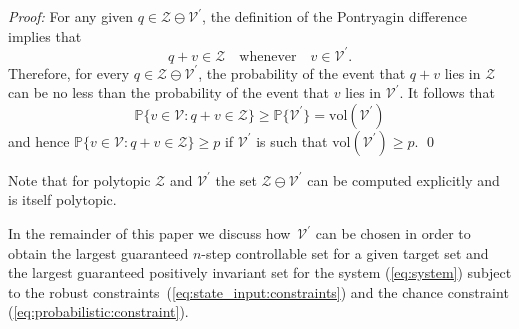 \documentclass{ifacconf}
\def\bpf{\textnormal{\textit{Proof:}\hspace{1ex}}}
\def\epf{\hfill \mbox{\qed}}%
\providecommand{\vol}{\text{vol}}
\providecommand{\V}{\mathcal V}
\providecommand{\Z}{\mathcal Z}
\providecommand{\PP}{\mathbb P}
\begin{document}
\bpf
%
For any given $q\in\Z\ominus\V^\prime$, the definition of the Pontryagin difference implies that
\[
q+v\in\Z \quad \text{whenever} \quad  v\in\V^\prime.
\]
Therefore, for every $q\in\Z\ominus\V^\prime$, the probability of the event that $q+v$ lies in $\Z$ can be no less than the probability of the event that $v$ lies in $\V^\prime$. It follows that 
\[
\PP\{ v\in\V : q + v\in \Z\} \geq \PP\{\V^\prime\} = \vol(\V^\prime)
\]
and hence $\PP\{ v\in\V : q + v\in \Z\} \geq p$ if $\V^\prime$ is such that $\vol(\V^\prime) \geq p$.
\epf
%

Note that for polytopic $\Z$ and $\V^\prime$ the set $\Z\ominus\V^\prime$ can be computed explicitly and is itself polytopic.

In the remainder of this paper we discuss how~$\V^\prime$ can be chosen in order to obtain the largest guaranteed $n$-step controllable set for a given target set and the largest guaranteed positively invariant set for the system (\ref{eq:system}) subject to the robust constraints~(\ref{eq:state_input:constraints}) and the chance constraint (\ref{eq:probabilistic:constraint}).
\end{document}
